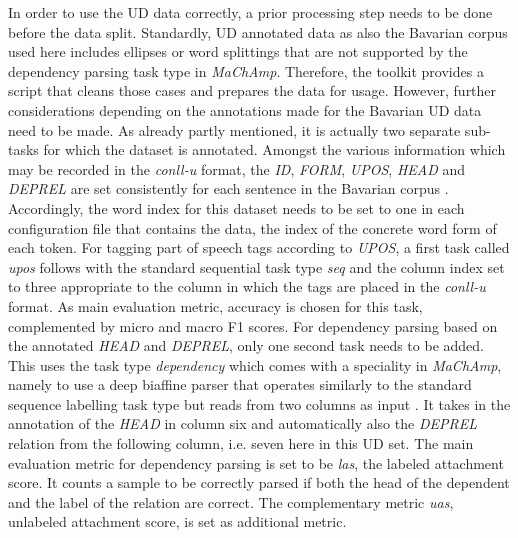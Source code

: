\documentclass[11pt,a4paper,twoside,openright]{scrbook}
\begin{document}
In order to use the UD data correctly, a prior processing step needs to be done before the data split. Standardly, UD annotated data as also the Bavarian corpus used here includes ellipses or word splittings that are not supported by the dependency parsing task type in \textit{MaChAmp}. Therefore, the toolkit provides a script that cleans those cases and prepares the data for usage. However, further considerations depending on the annotations made for the Bavarian UD data need to be made. As already partly mentioned, it is actually two separate sub-tasks for which the dataset is annotated. Amongst the various information which may be recorded in the \textit{conll-u} format, the \textit{ID}, \textit{FORM}, \textit{UPOS}, \textit{HEAD} and \textit{DEPREL} are set consistently for each sentence in the Bavarian corpus \citep{blaschke-etal-2024-maibaam-multi}. Accordingly, the word index for this dataset needs to be set to one in each configuration file that contains the data, the index of the concrete word form of each token. For tagging part of speech tags according to \textit{UPOS}, a first task called \textit{upos} follows with the standard sequential task type \textit{seq} and the column index set to three appropriate to the column in which the tags are placed in the \textit{conll-u} format. As main evaluation metric, accuracy is chosen for this task, complemented by micro and macro F1 scores. For dependency parsing based on the annotated \textit{HEAD} and \textit{DEPREL}, only one second task needs to be added. This uses the task type \textit{dependency} which comes with a speciality in \textit{MaChAmp}, namely to use a deep biaffine parser that operates similarly to the standard sequence labelling task type but reads from two columns as input \citep{van-der-goot-etal-2021-massive}. It takes in the annotation of the \textit{HEAD} in column six and automatically also the \textit{DEPREL} relation from the following column, i.e. seven here in this UD set. The main evaluation metric for dependency parsing is set to be \textit{las}, the labeled attachment score. It counts a sample to be correctly parsed if both the head of the dependent and the label of the relation are correct. The complementary metric \textit{uas}, unlabeled attachment score, is set as additional metric. 
\end{document}
